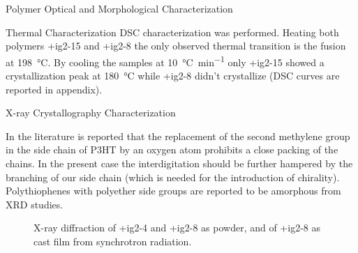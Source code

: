 \begin{section}{Polymer Optical and Morphological Characterization}
\begin{subsection}{Thermal Characterization}
\Gls{DSC} characterization was performed. Heating both polymers \cmpd+{ig2-15} and \cmpd+{ig2-8} the only observed thermal transition is the fusion at \SI{198}{\celsius}. By cooling the samples at \SI{10}{\celsius\per\minute} only \cmpd+{ig2-15} showed a crystallization peak at \SI{180}{\celsius} while \cmpd+{ig2-8} didn't crystallize (\gls{DSC} curves are reported in appendix).

\end{subsection}
\clearpage
\begin{subsection}{X-ray Crystallography Characterization}
\label{xrd}

In the literature is reported that the replacement of the second methylene group in the side chain of \gls{P3HT} by an oxy\-gen atom prohibits a close packing of the chains. In the present case the interdigitation should be further hampered by the branching of our side chain (which is needed for the introduction of chirality). Polythio\-phenes with poly\-ether side groups are reported to be amorphous from \gls{XRD} studies. 

\begin{figure}[tbp]%
 \caption{X-ray diffraction of \cmpd+{ig2-4} and \cmpd+{ig2-8} as powder, and of \cmpd+{ig2-8} as cast film from synchrotron radiation.}
\label{fig:xrd}
\end{figure}


\end{subsection}
\end{section}

